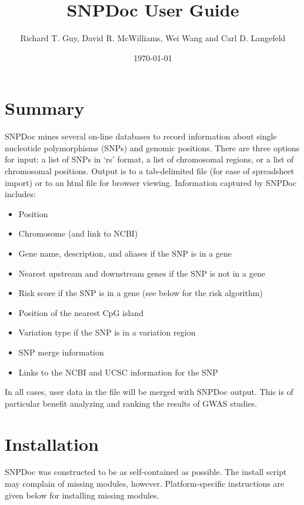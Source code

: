\documentclass[11pt]{article}
\title{SNPDoc User Guide}
\author{Richard T. Guy, David R. McWilliams, Wei Wang and Carl D. Langefeld}
\date{\today}
\begin{document}
\maketitle

\setcounter{tocdepth}{3}
\tableofcontents
\vspace*{1cm}

\section{Summary}
\label{sec-2}


  SNPDoc mines several on-line databases to record information about single
  nucleotide polymorphisms (SNPs) and genomic positions.  There are three
  options for input: a list of SNPs in `rs' format, a list of chromosomal
  regions, or a list of chromosomal positions.  Output is to a tab-delimited file
  (for ease of spreadsheet import) or to an html file for browser viewing.
  Information captured by SNPDoc includes:

\begin{itemize}
\item Position
\item Chromosome (and link to NCBI)
\item Gene name, description, and aliases if the SNP is in a gene
\item Nearest upstream and downstream genes if the SNP is not in a gene
\item Risk score if the SNP is in a gene (see below for the risk algorithm)
\item Position of the nearest CpG island
\item Variation type if the SNP is in a variation region
\item SNP merge information
\item Links to the NCBI and UCSC information for the SNP
\end{itemize}

  In all cases, user data in the file will be merged with SNPDoc output.  This
  is of particular benefit analyzing and ranking the results of GWAS studies.
\section{Installation}
\label{sec-3}


  SNPDoc was constructed to be as self-contained as possible.  The install
  script may complain of missing modules, however.  Platform-specific
  instructions are given below for installing missing modules.
\end{document}
